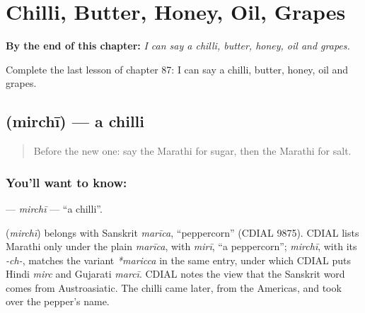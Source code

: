 
\chapter{Chilli, Butter, Honey, Oil, Grapes}
\label{ch:mr-chilli-butter-honey-oil-grapes}

\begin{chapteropening}
\textbf{By the end of this chapter:} \emph{I can say a chilli, butter, honey, oil and grapes.}

Complete the last lesson of chapter 87: I can say a chilli, butter, honey, oil and grapes.
\end{chapteropening}

\section[\texorpdfstring{\mr{मिरची} (mirchī)}{मिरची (mirchī)}]{ (mirchī) — a chilli}

\label{lesson:MR-C87-mirchi}



\begin{quote}
Before the new one: say the Marathi for sugar, then the Marathi for salt.
\end{quote}

\subsection*{You'll want to know: }
\textbf{} — \emph{mirchī} — \textquotedblleft{}a chilli\textquotedblright{}.

\begin{cousinweb}
\textbf{} (\emph{mirchī}) belongs with Sanskrit \emph{marīca}, \textquotedblleft{}peppercorn\textquotedblright{} (CDIAL 9875). CDIAL lists Marathi only under the plain \emph{marīca}, with \emph{mirī}, \textquotedblleft{}a peppercorn\textquotedblright{}; \emph{mirchī}, with its \emph{-ch-}, matches the variant \emph{*maricca} in the same entry, under which CDIAL puts Hindi \emph{mirc} and Gujarati \emph{marcī}. CDIAL notes the view that the Sanskrit word comes from Austroasiatic. The chilli came later, from the Americas, and took over the pepper's name.
\end{cousinweb}

